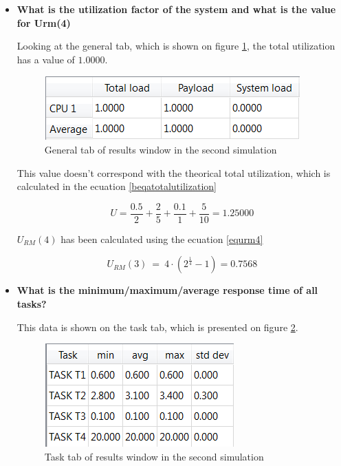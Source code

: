 \documentclass[12pt]{article}
\begin{document}
\begin{itemize}
\item \textbf{What is the utilization factor of the system and what is the value for Urm(4)}

Looking at the general tab, which is shown on figure \ref{bgeneraltab}, the total utilization has a value of $1.0000$.

\begin{figure}[h]
\centering
\includegraphics[scale=1]{figures/B_total_utilization}   
\caption{General tab of results window in the second simulation}
\label{bgeneraltab}
\end{figure}
\FloatBarrier

This value doesn't correspond with the theorical total utilization, which is calculated in the ecuation \ref{beqatotalutilization}

\begin{equation}\label{beqatotalutilization}
U= \frac{0.5}{2} + \frac{2}{5} + \frac{0.1}{1} + \frac{5}{10} = 1.25000 
\end{equation}

$U_{RM}(4)$ has been calculated using the ecuation \ref{equrm4}

\begin{equation}\label{equrm4}
U_{RM}(3)\ =\ 4·(2^{\frac{1}{4}}-1)=0.7568
\end{equation}

\item \textbf{What is the minimum/maximum/average response time of all tasks?}

This data is shown on the task tab, which is presented on figure \ref{btasktab}.

\begin{figure}[h]
\centering
\includegraphics[scale=1]{figures/B_tasks}   
\caption{Task tab of results window in the second simulation}
\label{btasktab}
\end{figure}
\FloatBarrier


\end{itemize}
\end{document}
